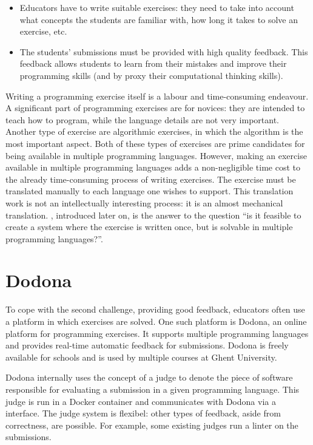 \documentclass[5p,number]{elsarticle}
\begin{document}
    \begin{itemize}
        \item Educators have to write suitable exercises: they need to take into account what concepts the students are familiar with, how long it takes to solve an exercise, etc.
        \item The students' submissions must be provided with high quality feedback.
        This feedback allows students to learn from their mistakes and improve their programming skills (and by proxy their computational thinking skills).
    \end{itemize}
    
    Writing a programming exercise itself is a labour and time-consuming endeavour.
    A significant part of programming exercises are for novices: they are intended to teach how to program, while the language details are not very important.
    Another type of exercise are algorithmic exercises, in which the algorithm is the most important aspect.
    Both of these types of exercises are prime candidates for being available in multiple programming languages.
    However, making an exercise available in multiple programming languages adds a non-negligible time cost to the already time-consuming process of writing exercises.
    The exercise must be translated manually to each language one wishes to support.
    This translation work is not an intellectually interesting process: it is an almost mechanical translation.
    \tested, introduced later on, is the answer to the question ``is it feasible to create a system where the exercise is written once, but is solvable in multiple programming languages?''.

    \section{Dodona}\label{sec:extended-dodona}
    
    To cope with the second challenge, providing good feedback, educators often use a platform in which exercises are solved.
    One such platform is Dodona, an online platform for programming exercises.
    It supports multiple programming languages and provides real-time automatic feedback for submissions.
    Dodona is freely available for schools and is used by multiple courses at Ghent University.

    Dodona internally uses the concept of a judge to denote the piece of software responsible for evaluating a submission in a given programming language.
    This judge is run in a Docker container and communicates with Dodona via a  interface.
    The judge system is flexibel: other types of feedback, aside from correctness, are possible.
    For example, some existing judges run a linter on the submissions.
    
\end{document}
